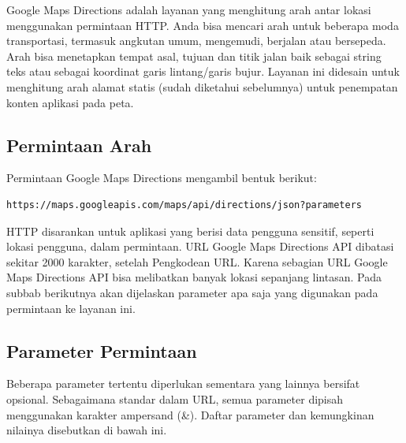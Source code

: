Google Maps Directions adalah layanan yang menghitung arah antar lokasi menggunakan permintaan HTTP. Anda bisa mencari arah untuk beberapa moda transportasi, termasuk angkutan umum, mengemudi, berjalan atau bersepeda. Arah bisa menetapkan tempat asal, tujuan dan titik jalan baik sebagai string teks atau sebagai koordinat garis lintang/garis bujur. Layanan ini didesain untuk menghitung arah alamat statis (sudah diketahui sebelumnya) untuk penempatan konten aplikasi pada peta.

\subsection{Permintaan Arah}
\label{subsec:permintaanarahgoogledir}

Permintaan Google Maps Directions mengambil bentuk berikut:

\begin{lstlisting}[caption= \textit{Request} Google Directions, captionpos=b]
https://maps.googleapis.com/maps/api/directions/json?parameters
\end{lstlisting}

HTTP disarankan untuk aplikasi yang berisi data pengguna sensitif, seperti lokasi pengguna, dalam permintaan. URL Google Maps Directions API dibatasi sekitar 2000 karakter, setelah Pengkodean URL. Karena sebagian URL Google Maps Directions API bisa melibatkan banyak lokasi sepanjang lintasan. Pada subbab berikutnya akan dijelaskan parameter apa saja yang digunakan pada permintaan ke layanan ini.

\subsection{Parameter Permintaan}
\label{subsec:parameterpermintaangoogledir}

Beberapa parameter tertentu diperlukan sementara yang lainnya bersifat opsional. Sebagaimana standar dalam URL, semua parameter dipisah menggunakan karakter ampersand (\&). Daftar parameter dan kemungkinan nilainya disebutkan di bawah ini\cite{ankurkotwal2017}.

